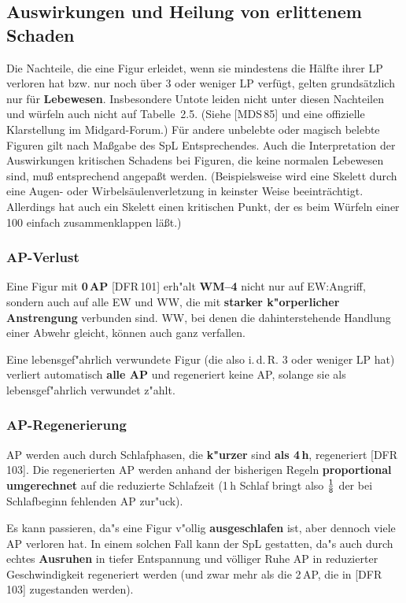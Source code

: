 \documentclass[10pt,a4paper,germanpar]{article}
\begin{document}
\subsection{Auswirkungen und Heilung von erlittenem Schaden}

Die Nachteile, die eine Figur erleidet, wenn sie mindestens die Hälfte
ihrer LP verloren hat bzw. nur noch über 3 oder weniger LP verfügt,
gelten grundsätzlich nur für \textbf{Lebewesen}. Insbesondere Untote
leiden nicht unter diesen Nachteilen und würfeln auch nicht auf
Tabelle~2.5. (Siehe [MDS\,85] und eine offizielle Klarstellung im
Midgard-Forum.) Für andere unbelebte oder magisch belebte Figuren gilt
nach Maßgabe des SpL Entsprechendes. Auch die Interpretation
der Auswirkungen kritischen Schadens bei Figuren, die keine normalen
Lebewesen sind, muß entsprechend angepaßt werden. (Beispielsweise wird
eine Skelett durch eine Augen- oder Wirbelsäulenverletzung in keinster
Weise beeinträchtigt. Allerdings hat auch ein Skelett einen kritischen
Punkt, der es beim Würfeln einer 100 einfach zusammenklappen läßt.)

\subsubsection{AP-Verlust}

Eine Figur mit \textbf{0\,AP} [DFR\,101] erh"alt \textbf{WM--4} nicht
nur auf EW:Angriff, sondern auch auf alle EW und WW, die mit
\textbf{starker k"orperlicher Anstrengung} verbunden sind. WW, bei
denen die dahinterstehende Handlung einer Abwehr gleicht, können
auch ganz verfallen.

Eine lebensgef"ahrlich verwundete Figur (die also i.\,d.\,R. 3 oder
weniger LP hat) verliert automatisch \textbf{alle AP} und regeneriert
keine AP, solange sie als lebensgef"ahrlich verwundet z"ahlt.

\subsubsection{AP-Regenerierung}

AP werden auch durch Schlafphasen, die \textbf{k"urzer} sind
\textbf{als 4\,h}, regeneriert [DFR\,103]. Die regenerierten AP werden
anhand der bisherigen Regeln \textbf{proportional umgerechnet} auf die
reduzierte Schlafzeit (1\,h Schlaf bringt also $\frac{\sf 1}{\sf 8}$
der bei Schlafbeginn fehlenden AP zur"uck).

Es kann passieren, da"s eine Figur v"ollig \textbf{ausgeschlafen} ist,
aber dennoch viele AP verloren hat. In einem solchen Fall kann der
SpL gestatten, da"s auch durch echtes \textbf{Ausruhen} in
tiefer Entspannung und völliger Ruhe AP in reduzierter Geschwindigkeit
regeneriert werden (und zwar mehr als die 2\,AP, die in [DFR\,103]
zugestanden werden).
\end{document}
